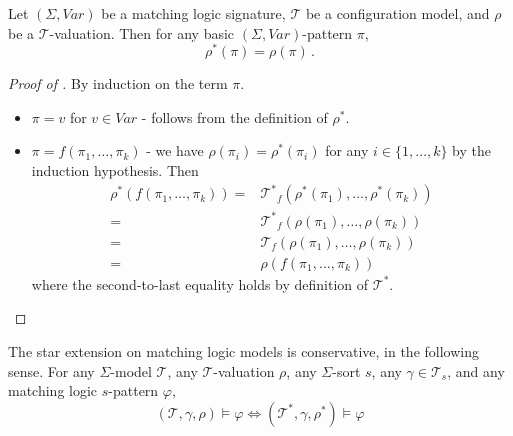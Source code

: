 \begin{lemma}\label{lem:rhoStarOfPi}
    Let $(\Sigma, \mathit{Var})$ be a matching logic signature, $\mathcal{T}$ be a configuration model,
    and $\rho$ be a $\mathcal{T}$-valuation. Then for any basic $(\Sigma, \mathit{Var})$-pattern $\pi$,
    \begin{equation}
        \rho^*(\pi) = \rho(\pi) \, .
    \end{equation}
\end{lemma}

\begin{proof}[Proof of ]
    By induction on the term $\pi$.
    \begin{itemize}
        \item $\pi = v$ for $v \in \mathit{Var}$ - follows from the definition of $\rho^*$.
        \item $\pi = f(\pi_1, \ldots, \pi_k)$ - we have $\rho(\pi_i) = \rho^*(\pi_i)$ for any $i \in \{ 1, \ldots, k \}$
              by the induction hypothesis.
              Then
              \begin{align*}
                  \rho^*(f(\pi_1, \ldots, \pi_k)) 
                  = & {\mathcal{T}^*}_f(\rho^*(\pi_1), \ldots, \rho^*(\pi_k)) \\
                  = & {\mathcal{T}^*}_f(\rho(\pi_1), \ldots, \rho(\pi_k)) \\
                  = & \mathcal{T}_f(\rho(\pi_1), \ldots, \rho(\pi_k)) \\
                  = & \rho(f(\pi_1, \ldots, \pi_k))
              \end{align*}
              where the second-to-last equality holds by definition of $\mathcal{T}^*$.
    \end{itemize}
\end{proof}

\begin{lemma}\label{lem:starConservative}
    The star extension on matching logic models is conservative, in the following sense.
    For any $\Sigma$-model $\mathcal{T}$, any $\mathcal{T}$-valuation $\rho$,
    any $\Sigma$-sort $s$,
    any $\gamma \in \mathcal{T}_s$,
    and any matching logic $s$-pattern $\varphi$,
    \begin{equation*}
        (\mathcal{T}, \gamma, \rho) \vDash \varphi \iff (\mathcal{T}^*, \gamma, \rho^*) \vDash \varphi
    \end{equation*}
\end{lemma}


